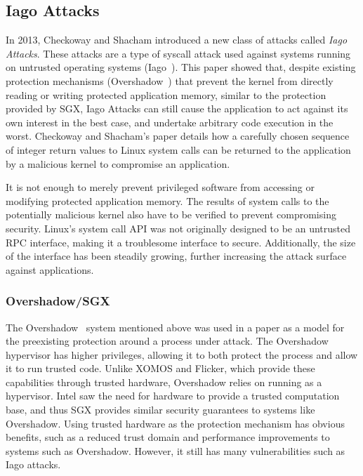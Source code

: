 \documentclass[letterpaper,twocolumn,10pt]{article}
\begin{document}
\subsection{Iago Attacks}
In 2013, Checkoway and Shacham introduced a new class of attacks called
\emph{Iago Attacks}. These attacks are a type of syscall attack used against 
systems running on untrusted operating systems (Iago~\cite{checkoway_iago_2013}). 
This paper showed that, despite existing protection mechanisms 
(Overshadow~\cite{chen_overshadow:_2008}) that prevent the kernel from directly 
reading or writing protected application memory, similar to the protection 
provided by SGX, Iago Attacks can still cause the application to act against its 
own interest in the best case, and undertake arbitrary code execution in the 
worst. Checkoway and Shacham's paper details how a carefully chosen sequence of
integer return values to Linux system calls can be returned to the application
by a malicious kernel to compromise an application.


It is not enough to merely prevent privileged software from accessing or
modifying protected application memory. The results of system calls to the
potentially malicious kernel also have to be verified to prevent compromising
security. Linux's system call API was not originally designed to be an
untrusted RPC interface, making it a troublesome interface to secure. Additionally, 
the size of the interface has been steadily growing, further increasing the 
attack surface against applications.

\subsubsection{Overshadow/SGX}
The Overshadow~\cite{chen_overshadow:_2008} system mentioned above was used in
a paper as a model for the preexisting protection around a process under
attack. The Overshadow hypervisor has higher privileges, allowing it to both
protect the process and allow it to run trusted code. Unlike XOMOS and Flicker,
which provide these capabilities through trusted hardware, Overshadow relies on
running as a hypervisor. Intel saw the need for hardware to provide a trusted
computation base, and thus SGX provides similar security guarantees to systems
like Overshadow. Using trusted hardware as the protection mechanism has obvious
benefits, such as a reduced trust domain and performance improvements to
systems such as Overshadow. However, it still has many vulnerabilities such as
Iago attacks.
\end{document}
